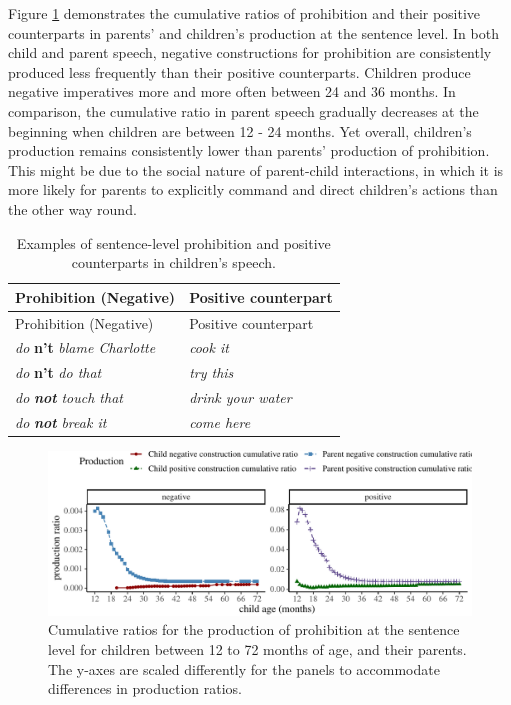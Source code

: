 \documentclass[
  man,floatsintext]{apa6}
\begin{document}
Figure \ref{fig:prohibition} demonstrates the cumulative ratios of prohibition and their positive counterparts in parents' and children's production at the sentence level. In both child and parent speech, negative constructions for prohibition are consistently produced less frequently than their positive counterparts. Children produce negative imperatives more and more often between 24 and 36 months. In comparison, the cumulative ratio in parent speech gradually decreases at the beginning when children are between 12 - 24 months. Yet overall, children's production remains consistently lower than parents' production of prohibition. This might be due to the social nature of parent-child interactions, in which it is more likely for parents to explicitly command and direct children's actions than the other way round.

\begin{longtable}[]{@{}ll@{}}
\caption{\label{tab:prohibit} Examples of sentence-level prohibition and positive counterparts in children's speech.}\tabularnewline
\toprule\noalign{}
Prohibition (Negative) & Positive counterpart \\
\midrule\noalign{}
\endfirsthead
\toprule\noalign{}
Prohibition (Negative) & Positive counterpart \\
\midrule\noalign{}
\endhead
\bottomrule\noalign{}
\endlastfoot
\emph{do} \textbf{n't} \emph{blame Charlotte} & \emph{cook it} \\
\emph{do} \textbf{n't} \emph{do that} & \emph{try this} \\
\emph{do} \textbf{\emph{not}} \emph{touch that} & \emph{drink your water} \\
\emph{do} \textbf{\emph{not}} \emph{break it} & \emph{come here} \\
\end{longtable}

\begin{figure}[H]

{\centering \includegraphics{neg_construction_article_files/figure-latex/prohibition-1} 

}

\caption{Cumulative ratios for the production of prohibition at the sentence level for children between 12 to 72 months of age, and their parents. The y-axes are scaled differently for the panels to accommodate differences in production ratios.}\label{fig:prohibition}
\end{figure}
\end{document}
